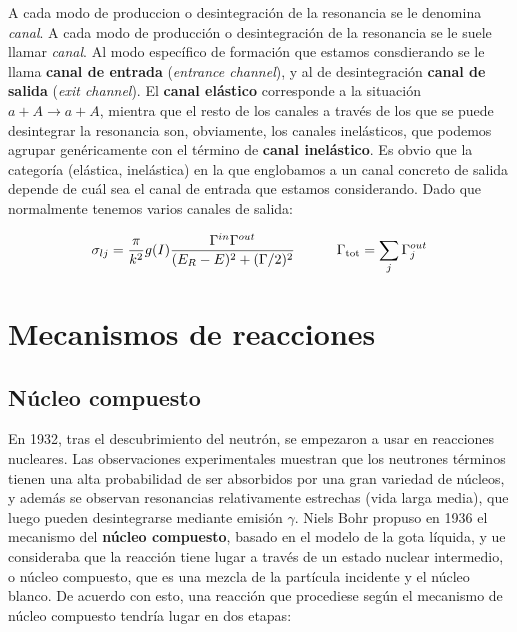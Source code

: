 A cada modo de produccion o desintegración de la resonancia se le denomina \textit{canal}. A cada modo de producción o desintegración de la resonancia se le suele llamar \textit{canal}. Al modo específico de formación que estamos consdierando se le llama \textbf{canal de entrada} (\textit{entrance channel}), y al de desintegración \textbf{canal de salida} (\textit{exit channel}). El \textbf{canal elástico} corresponde a la situación $a+A\rightarrow a+A$, mientra que el resto de los canales a través de los que se puede desintegrar la resonancia son, obviamente, los canales inelásticos, que podemos agrupar genéricamente con el término de \textbf{canal inelástico}. Es obvio que la categoría (elástica, inelástica) en la que englobamos a un canal concreto de salida depende de cuál sea el canal de entrada que estamos considerando.  Dado que normalmente tenemos varios canales de salida:

\begin{equation}
	\sigma_{lj} = \frac{\pi}{k^2} g(I) \frac{\Gamma^{in} \Gamma^{out}}{(E_R-E)^2 + (\Gamma/2)^2} \quad \quad \quad \Gamma_{\text{tot}} = \sum_{j} \Gamma_j^{out}
\end{equation}


\section{Mecanismos de reacciones}

\subsection{Núcleo compuesto}

En 1932, tras el descubrimiento del neutrón, se empezaron a usar en reacciones nucleares. Las observaciones experimentales muestran que los neutrones términos tienen una alta probabilidad de ser absorbidos por una gran variedad de núcleos, y además se observan resonancias relativamente estrechas (vida larga media), que luego pueden desintegrarse mediante emisión $\gamma$. Niels Bohr propuso en 1936 el mecanismo del \textbf{núcleo compuesto}, basado en el modelo de la gota líquida, y ue consideraba que la reacción tiene lugar a través de un estado nuclear intermedio, o núcleo compuesto, que es una mezcla de la partícula incidente y el núcleo blanco. De acuerdo con esto, una reacción que procediese según el mecanismo de núcleo compuesto tendría lugar en dos etapas:

